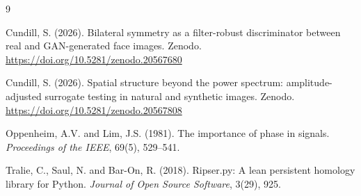 \documentclass[11pt,a4paper]{article}
\begin{document}
\begin{thebibliography}{9}

Cundill, S. (2026).
Bilateral symmetry as a filter-robust discriminator between real and GAN-generated face images.
Zenodo. \url{https://doi.org/10.5281/zenodo.20567680}

Cundill, S. (2026).
Spatial structure beyond the power spectrum: amplitude-adjusted surrogate testing in natural and synthetic images.
Zenodo. \url{https://doi.org/10.5281/zenodo.20567808}

Oppenheim, A.V. and Lim, J.S. (1981).
The importance of phase in signals.
\textit{Proceedings of the IEEE}, 69(5), 529--541.

Tralie, C., Saul, N. and Bar-On, R. (2018).
Ripser.py: A lean persistent homology library for Python.
\textit{Journal of Open Source Software}, 3(29), 925.

\end{thebibliography}
\end{document}
